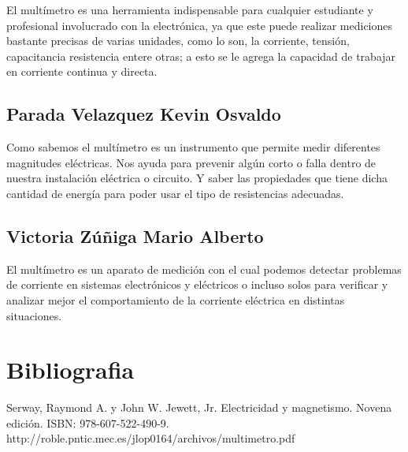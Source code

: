\documentclass[11pt]{article}
\begin{document}
\begin{multicols}{2}
El multímetro es una herramienta indispensable para cualquier estudiante y profesional involucrado con la electrónica, ya que este puede realizar mediciones bastante precisas de varias unidades, como lo son, la corriente, tensión, capacitancia resistencia entere otras; a esto se le agrega la capacidad de trabajar en corriente continua y directa.

\subsection{Parada Velazquez Kevin Osvaldo}
Como sabemos el multímetro es un instrumento que permite medir diferentes magnitudes eléctricas. Nos ayuda para prevenir algún corto o falla dentro de nuestra instalación eléctrica o circuito. Y saber las propiedades que tiene dicha cantidad de energía para poder usar el tipo de resistencias adecuadas. 


\subsection{Victoria Zúñiga Mario Alberto}
El multímetro es un aparato de medición con el cual podemos detectar problemas de corriente en sistemas electrónicos y eléctricos o incluso solos para verificar y analizar mejor el comportamiento de la corriente eléctrica en distintas situaciones.


\section{Bibliografia}
Serway, Raymond A. y John W. Jewett, Jr. Electricidad y magnetismo. Novena edición. ISBN: 978-607-522-490-9.\\
http://roble.pntic.mec.es/jlop0164/archivos/multimetro.pdf

\end{multicols}
\end{document}
